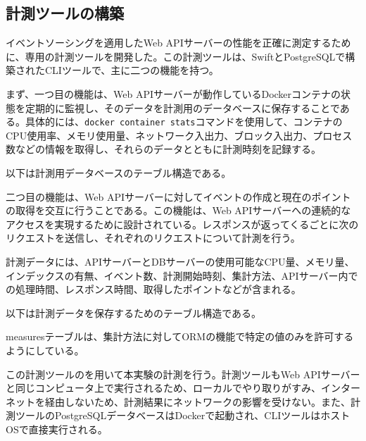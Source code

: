 \documentclass[../../../main]{subfiles}
\begin{document}
    \subsection{計測ツールの構築}\label{subsec:method-measurement_tool}

    イベントソーシングを適用したWeb APIサーバーの性能を正確に測定するために、専用の計測ツールを開発した。この計測ツールは、SwiftとPostgreSQLで構築されたCLIツールで、主に二つの機能を持つ。

    まず、一つ目の機能は、Web APIサーバーが動作しているDockerコンテナの状態を定期的に監視し、そのデータを計測用のデータベースに保存することである。具体的には、\texttt{docker container stats}コマンドを使用して、コンテナのCPU使用率、メモリ使用量、ネットワーク入出力、ブロック入出力、プロセス数などの情報を取得し、それらのデータとともに計測時刻を記録する。

    以下は計測用データベースのテーブル構造である。

    

    二つ目の機能は、Web APIサーバーに対してイベントの作成と現在のポイントの取得を交互に行うことである。この機能は、Web APIサーバーへの連続的なアクセスを実現するために設計されている。レスポンスが返ってくるごとに次のリクエストを送信し、それぞれのリクエストについて計測を行う。

    計測データには、APIサーバーとDBサーバーの使用可能なCPU量、メモリ量、インデックスの有無、イベント数、計測開始時刻、集計方法、APIサーバー内での処理時間、レスポンス時間、取得したポイントなどが含まれる。

    以下は計測データを保存するためのテーブル構造である。

    

    measuresテーブルは、集計方法に対してORMの機能で特定の値のみを許可するようにしている。

    この計測ツールのを用いて本実験の計測を行う。計測ツールもWeb APIサーバーと同じコンピュータ上で実行されるため、ローカルでやり取りがすみ、インターネットを経由しないため、計測結果にネットワークの影響を受けない。また、計測ツールのPostgreSQLデータベースはDockerで起動され、CLIツールはホストOSで直接実行される。
\end{document}
